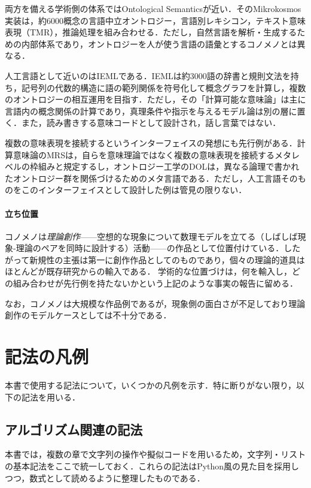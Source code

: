 \documentclass[../main-detail.tex]{subfiles}
\begin{document}
両方を備える学術側の体系ではOntological Semantics\cite{nirenburg-raskin2004}が近い．そのMikrokosmos実装は，約6000概念の言語中立オントロジー，言語別レキシコン，テキスト意味表現（TMR），推論処理を組み合わせる．ただし，自然言語を解析・生成するための内部体系であり，オントロジーを人が使う言語の語彙とするコノメノとは異なる．

人工言語として近いのはIEMLである\cite{levy2010ieml,levy2023ieml}．IEMLは約3000語の辞書と規則文法を持ち，記号列の代数的構造に語の範列関係を符号化して概念グラフを計算し，複数のオントロジーの相互運用を目指す．ただし，その「計算可能な意味論」は主に言語内の概念関係の計算であり，真理条件や指示を与えるモデル論は別の層に置く．また，読み書きする意味コードとして設計され，話し言葉ではない．

複数の意味表現を接続するというインターフェイスの発想にも先行例がある．計算意味論のMRSは，自らを意味理論ではなく複数の意味表現を接続するメタレベルの枠組みと規定する\cite{copestake2005mrs}し，オントロジー工学のDOLは，異なる論理で書かれたオントロジー群を関係づけるためのメタ言語である\cite{mossakowski2015dol}．ただし，人工言語そのものをこのインターフェイスとして設計した例は管見の限りない．

\paragraph{立ち位置}
コノメノは\emph{理論創作}——空想的な現象について数理モデルを立てる（しばしば現象-理論のペアを同時に設計する）活動——の作品として位置付けている．したがって新規性の主張は第一に創作作品としてのものであり，個々の理論的道具はほとんどが既存研究からの輸入である．
学術的な位置づけは，何を輸入し，どの組み合わせが先行例を持たないかという上記のような事実の報告に留める．

なお，コノメノは大規模な作品例であるが，現象側の面白さが不足しており理論創作のモデルケースとしては不十分である．

\section{記法の凡例}
本書で使用する記法について，いくつかの凡例を示す．特に断りがない限り，以下の記法を用いる．
\subsection{アルゴリズム関連の記法}
本書では，複数の章で文字列の操作や擬似コードを用いるため，文字列・リストの基本記法をここで統一しておく．これらの記法はPython風の見た目を採用しつつ，数式として読めるように整理したものである．
\end{document}
